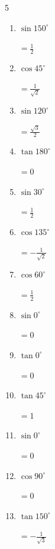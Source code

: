 \begin{multicols}{5}
\begin{enumerate}
  \item $\displaystyle \sin{150^\circ}$

        $\displaystyle =\frac{1}{2}$

  \item $\displaystyle \cos{45^\circ}$

        $\displaystyle =\frac{1}{\sqrt{2}}$

  \item $\displaystyle \sin{120^\circ}$

        $\displaystyle =\frac{\sqrt{3}}{2}$

  \item $\displaystyle \tan{180^\circ}$

        $\displaystyle =0$

\columnbreak %

  \item $\displaystyle \sin{30^\circ}$

        $\displaystyle =\frac{1}{2}$

  \item $\displaystyle \cos{135^\circ}$

        $\displaystyle =-\frac{1}{\sqrt{2}}$

  \item $\displaystyle \cos{60^\circ}$

        $\displaystyle =\frac{1}{2}$

  \item $\displaystyle \sin{0^\circ}$

        $\displaystyle =0$

  \item $\displaystyle \tan{0^\circ}$

        $\displaystyle =0$

  \item $\displaystyle \tan{45^\circ}$

        $\displaystyle =1$

  \item $\displaystyle \sin{0^\circ}$

        $\displaystyle =0$

  \item $\displaystyle \cos{90^\circ}$

        $\displaystyle =0$

  \item $\displaystyle \tan{150^\circ}$

        $\displaystyle =-\frac{1}{\sqrt{3}}$


\end{enumerate}
\end{multicols}
